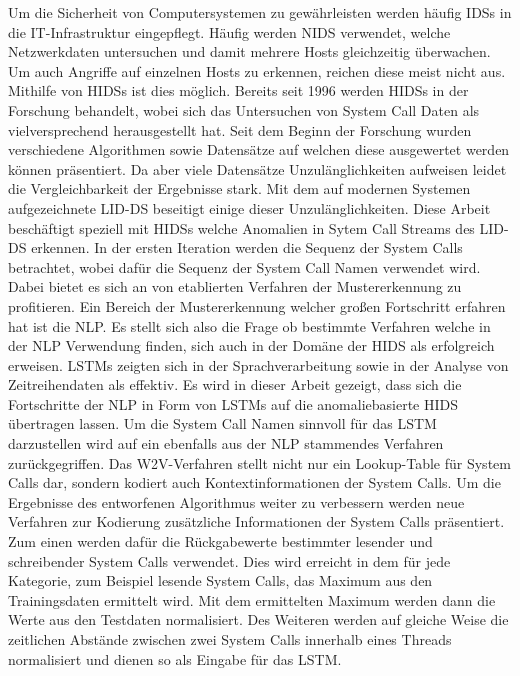 Um die Sicherheit von Computersystemen zu gewährleisten werden häufig \acp{IDS} in die IT-Infrastruktur eingepflegt.
Häufig werden \ac{NIDS} verwendet, welche Netzwerkdaten untersuchen und damit mehrere Hosts gleichzeitig überwachen.
Um auch Angriffe auf einzelnen Hosts zu erkennen, reichen diese meist nicht aus.
Mithilfe von \acp{HIDS} ist dies möglich.
Bereits seit 1996 werden \acp{HIDS} in der Forschung behandelt, wobei sich das Untersuchen von System Call Daten als vielversprechend herausgestellt hat.
Seit dem Beginn der Forschung wurden verschiedene Algorithmen sowie Datensätze auf welchen diese ausgewertet werden können präsentiert.
Da aber viele Datensätze Unzulänglichkeiten aufweisen leidet die Vergleichbarkeit der Ergebnisse stark.
Mit dem auf modernen Systemen aufgezeichnete \ac{LID-DS} beseitigt einige dieser Unzulänglichkeiten.
Diese Arbeit beschäftigt speziell mit \acp{HIDS} welche Anomalien in Sytem Call Streams des \ac{LID-DS} erkennen. 
In der  ersten Iteration werden die Sequenz der System Calls betrachtet, wobei dafür die Sequenz der System Call Namen verwendet wird.
Dabei bietet es sich an von etablierten Verfahren der Mustererkennung zu profitieren.
Ein Bereich der Mustererkennung welcher großen Fortschritt erfahren hat ist die \ac{NLP}.
Es stellt sich also die Frage ob bestimmte Verfahren welche in der \ac{NLP} Verwendung finden, sich auch in der Domäne der \ac{HIDS} als erfolgreich erweisen.
\acp{LSTM} zeigten sich in der Sprachverarbeitung sowie in der Analyse von Zeitreihendaten als effektiv.
Es wird in dieser Arbeit gezeigt, dass sich die Fortschritte der \ac{NLP} in Form von \acp{LSTM} auf die anomaliebasierte \ac{HIDS} übertragen lassen.
Um die System Call Namen sinnvoll für das \ac{LSTM} darzustellen wird auf ein ebenfalls aus der \ac{NLP} stammendes Verfahren zurückgegriffen.
Das \ac{W2V}-Verfahren stellt nicht nur ein Lookup-Table für System Calls dar, sondern kodiert auch Kontextinformationen der System Calls.
Um die Ergebnisse des entworfenen Algorithmus weiter zu verbessern werden neue Verfahren zur Kodierung zusätzliche Informationen der System Calls präsentiert.
Zum einen werden dafür die Rückgabewerte bestimmter lesender und schreibender System Calls verwendet. 
Dies wird erreicht in dem für jede Kategorie, zum Beispiel lesende System Calls, das Maximum aus den Trainingsdaten ermittelt wird.
Mit dem ermittelten Maximum werden dann die Werte aus den Testdaten normalisiert.
Des Weiteren werden auf gleiche Weise die zeitlichen Abstände zwischen zwei System Calls innerhalb eines Threads normalisiert und dienen so als Eingabe für das \ac{LSTM}.
